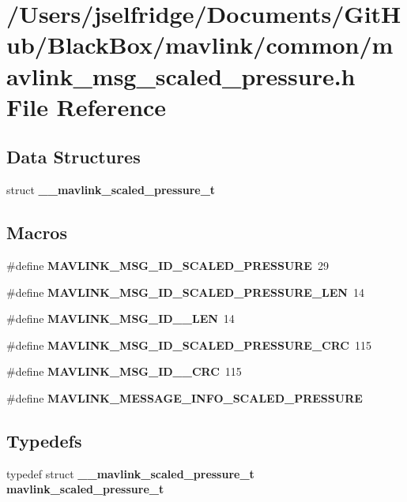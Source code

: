 \section{/\+Users/jselfridge/\+Documents/\+Git\+Hub/\+Black\+Box/mavlink/common/mavlink\+\_\+msg\+\_\+scaled\+\_\+pressure.h File Reference}
\label{mavlink__msg__scaled__pressure_8h}
\subsection*{Data Structures}
\begin{DoxyCompactItemize}
\item 
struct \textbf{ \+\_\+\+\_\+mavlink\+\_\+scaled\+\_\+pressure\+\_\+t}
\end{DoxyCompactItemize}
\subsection*{Macros}
\begin{DoxyCompactItemize}
\item 
\#define \textbf{ M\+A\+V\+L\+I\+N\+K\+\_\+\+M\+S\+G\+\_\+\+I\+D\+\_\+\+S\+C\+A\+L\+E\+D\+\_\+\+P\+R\+E\+S\+S\+U\+RE}~29
\item 
\#define \textbf{ M\+A\+V\+L\+I\+N\+K\+\_\+\+M\+S\+G\+\_\+\+I\+D\+\_\+\+S\+C\+A\+L\+E\+D\+\_\+\+P\+R\+E\+S\+S\+U\+R\+E\+\_\+\+L\+EN}~14
\item 
\#define \textbf{ M\+A\+V\+L\+I\+N\+K\+\_\+\+M\+S\+G\+\_\+\+I\+D\+\_\+\_\+\+L\+EN}~14
\item 
\#define \textbf{ M\+A\+V\+L\+I\+N\+K\+\_\+\+M\+S\+G\+\_\+\+I\+D\+\_\+\+S\+C\+A\+L\+E\+D\+\_\+\+P\+R\+E\+S\+S\+U\+R\+E\+\_\+\+C\+RC}~115
\item 
\#define \textbf{ M\+A\+V\+L\+I\+N\+K\+\_\+\+M\+S\+G\+\_\+\+I\+D\+\_\+\_\+\+C\+RC}~115
\item 
\#define \textbf{ M\+A\+V\+L\+I\+N\+K\+\_\+\+M\+E\+S\+S\+A\+G\+E\+\_\+\+I\+N\+F\+O\+\_\+\+S\+C\+A\+L\+E\+D\+\_\+\+P\+R\+E\+S\+S\+U\+RE}
\end{DoxyCompactItemize}
\subsection*{Typedefs}
\begin{DoxyCompactItemize}
\item 
typedef struct \textbf{ \+\_\+\+\_\+mavlink\+\_\+scaled\+\_\+pressure\+\_\+t} \textbf{ mavlink\+\_\+scaled\+\_\+pressure\+\_\+t}
\end{DoxyCompactItemize}


